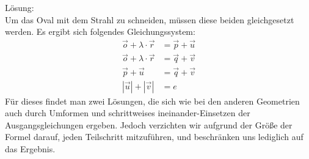 \documentclass[reducespace,stylepage,semiarbeit]{spezidoc}
\begin{document}
Lösung: \\
Um das Oval mit dem Strahl zu schneiden, müssen diese beiden gleichgesetzt werden. Es ergibt sich folgendes Gleichungssystem:
\begin{equation*}
\begin{split}
\vec{o} + \lambda \cdot \vec{r} &= \vec{p} + \vec{u} \\
\vec{o} + \lambda \cdot \vec{r} &= \vec{q} + \vec{v} \\
\vec{p} + \vec{u} &= \vec{q} + \vec{v} \\
|\vec{u}| + |\vec{v}| &= e
\end{split}
\end{equation*}
Für dieses findet man zwei Lösungen, die sich wie bei den anderen Geometrien auch durch Umformen und schrittweises ineinander-Einsetzen der Ausgangsgleichungen ergeben. Jedoch verzichten wir aufgrund der Größe der Formel darauf, jeden Teilschritt mitzuführen, und beschränken uns lediglich auf das Ergebnis.
\end{document}
